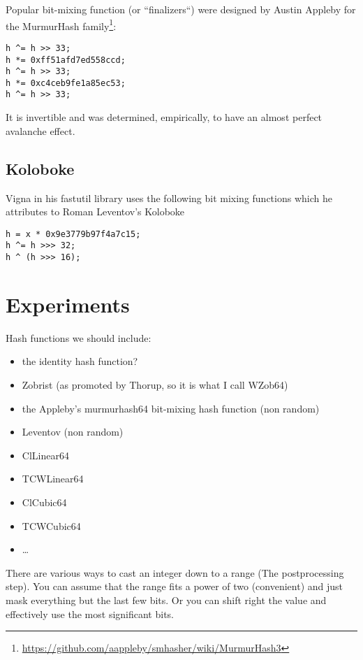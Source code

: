 \documentclass{article}
\begin{document}
Popular bit-mixing function (or ``finalizers``) were designed by Austin	Appleby for the MurmurHash family\footnote{\url{https://github.com/aappleby/smhasher/wiki/MurmurHash3}}:


\begin{lstlisting}
h ^= h >> 33;
h *= 0xff51afd7ed558ccd;
h ^= h >> 33;
h *= 0xc4ceb9fe1a85ec53;
h ^= h >> 33;
\end{lstlisting}

It is invertible and was determined, empirically, to have an almost perfect avalanche effect.

\subsection{Koloboke}

Vigna in his fastutil library uses the following bit mixing functions which he attributes to  Roman Leventov's Koloboke


\begin{lstlisting}
h = x * 0x9e3779b97f4a7c15;
h ^= h >>> 32;
h ^ (h >>> 16);
\end{lstlisting}




\section{Experiments}



Hash functions we should include:
\begin{itemize}
\item the identity hash function? 
\item Zobrist (as promoted by Thorup, so it is what I call WZob64)
\item  the Appleby's murmurhash64 bit-mixing hash function (non random)
\item Leventov (non random)
\item ClLinear64
\item TCWLinear64
\item ClCubic64
\item TCWCubic64~\cite{Thorup:2004:TBH:982792.982884}
\item \ldots 
\end{itemize}



There are various ways to cast an integer down to a range (The postprocessing step). You can assume that the range fits a power of two (convenient) and just mask everything but the last few bits. Or you can shift right the value and effectively use the most significant bits.
\end{document}

